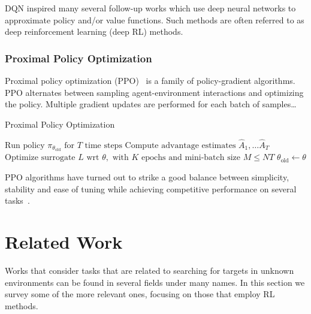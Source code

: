 DQN inspired many several follow-up works which use deep neural networks to approximate policy and/or value functions.
Such methods are often referred to as deep reinforcement learning (deep RL) methods.

\subsubsection{Proximal Policy Optimization}
\label{sec:ppo}



Proximal policy optimization (PPO)~\cite{schulman_ppo_2017} is a family of policy-gradient algorithms.
PPO alternates between sampling agent-environment interactions and optimizing the policy.
Multiple gradient updates are performed for each batch of samples\dots

\begin{algorithm}
    \caption{Proximal Policy Optimization}
    \begin{algorithmic}
                \State \(\text{Run policy } \pi_{\theta_\text{old}} \text{ for } T \text{ time steps}\)
                \State \(\text{Compute advantage estimates } \hat{A}_1, \dots \hat{A}_T\)
            \EndFor
            \State \(\text{Optimize surrogate } L \text{ wrt } \theta, \text{ with } K \text{ epochs and mini-batch size } M \leq NT\)
            \State \(\theta_{\text{old}} \leftarrow \theta\)
        \EndFor
    \end{algorithmic}
\end{algorithm}

PPO algorithms have turned out to strike a good balance between simplicity, stability and ease of tuning while achieving competitive performance on several tasks~\cite{schulman_ppo_2017,henderson_matters_2018,cobbe_procgen_2020,vinyals_alphastar_2019,andrychowicz_empirical_2020}.

\section{Related Work}
\label{sec:relatedwork}

Works that consider tasks that are related to searching for targets in unknown environments can be found in several fields under many names.
In this section we survey some of the more relevant ones, focusing on those that employ RL methods.

